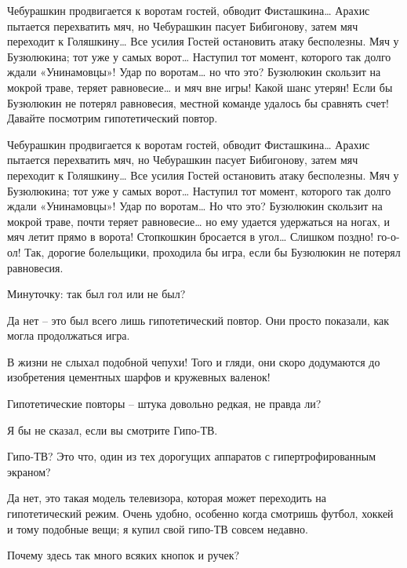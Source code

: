 \documentclass[../main.tex]{subfiles}
\begin{document}
\begin{dialogue}
 Чебурашкин продвигается к воротам гостей, обводит Фисташкина\ldots{} Арахис пытается перехватить мяч, но Чебурашкин пасует Бибигонову, затем мяч переходит к Голяшкину\ldots{} Все усилия Гостей остановить атаку бесполезны. Мяч у Бузюлюкина; тот уже у самых ворот\ldots{} Наступил тот момент, которого так долго ждали «Унинамовцы»! Удар по воротам\ldots{} но что это? Бузюлюкин скользит на мокрой траве, теряет равновесие\ldots{} и мяч вне игры! Какой шанс утерян! Если бы Бузюлюкин не потерял равновесия, местной команде удалось бы сравнять счет! Давайте посмотрим гипотетический повтор.


Чебурашкин продвигается к воротам гостей, обводит Фисташкина\ldots{} Арахис пытается перехватить мяч, но Чебурашкин пасует Бибигонову, затем мяч переходит к Голяшкину\ldots{} Все усилия Гостей остановить атаку бесполезны. Мяч у Бузюлюкина; тот уже у самых ворот\ldots{} Наступил тот момент, которого так долго ждали «Унинамовцы»! Удар по воротам\ldots{} Но что это? Бузюлюкин скользит на мокрой траве, почти теряет равновесие\ldots{} но ему удается удержаться на ногах, и мяч летит прямо в ворота! Стопкошкин бросается в угол\ldots{} Слишком поздно! го-о-ол! Так, дорогие болельщики, проходила бы игра, если бы Бузюлюкин не потерял равновесия.

 Минуточку: так был гол или не был?

 Да нет \--- это был всего лишь гипотетический повтор. Они просто показали, как могла продолжаться игра.

 В жизни не слыхал подобной чепухи! Того и гляди, они скоро додумаются до изобретения цементных шарфов и кружевных валенок!

 Гипотетические повторы \--- штука довольно редкая, не правда ли?

 Я бы не сказал, если вы смотрите Гипо-ТВ.

 Гипо-ТВ? Это что, один из тех дорогущих аппаратов с гипертрофированным экраном?

 Да нет, это такая модель телевизора, которая может переходить на гипотетический режим. Очень удобно, особенно когда смотришь футбол, хоккей и тому подобные вещи; я купил свой гипо-ТВ совсем недавно.

 Почему здесь так много всяких кнопок и ручек?


\end{dialogue}
\end{document}
